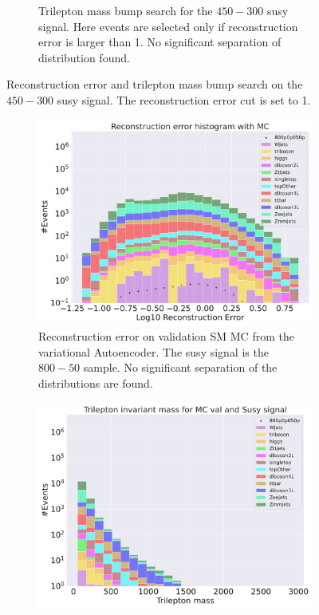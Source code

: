 \begin{figure}[h!]
\begin{subfigure}{.8\textwidth}
        \caption{Trilepton mass bump search for the $450-300$ susy signal. Here events are selected only if reconstruction error is larger than 1. No significant 
        separation of distribution found.}
        \label{fig:vae_susy_450_300_trilep}
    \end{subfigure}
    \hfill        
    \caption{ Reconstruction error and trilepton mass bump search on the $450-300$ susy signal. The reconstruction error cut is set to 1.}
    \label{fig:vae_susy_450_300_recon_trilep}
\end{figure}


\begin{figure}[h!]
    \centering
    \begin{subfigure}{.8\textwidth}
        \includegraphics[width=\textwidth]{Figures/VAE_testing/b_data_recon_big_rm3_feats_sig_800p0p050p.pdf}
        \caption{Reconstruction error on validation SM MC from the variational Autoencoder. The susy signal is the $800-50$ sample. 
        No significant separation of the distributions are found. }
        \label{fig:vae_susy_800_50_recon}
    \end{subfigure}
    \hfill
    \begin{subfigure}{.8\textwidth}
        \includegraphics[width=\textwidth]{Figures/VAE_testing/b_data_recon_big_rm3_feats_sig_800p0p050p_Trilepton mass.pdf}

\end{subfigure}
\end{figure}
